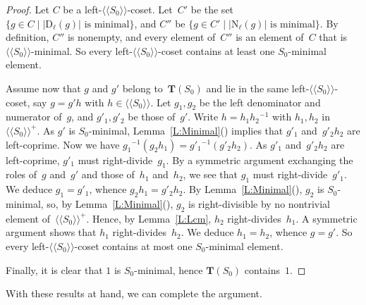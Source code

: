 \documentclass{amsart}
\numberwithin{equation}{section}
\theoremstyle{plain}
\theoremstyle{definition}
\newcounter{ITEM}
\begin{document}
\begin{proof}
Let ${C}$ be a left-${\langle\!\langle{{{S}_0}}\rangle\!\rangle}$-coset. Let~${C}'$ be the set
$\{{g} \in {C} \mid \mbox{${\vert{{{\scriptstyle\mathrm{D}}{_{\ell}}({g})}}\vert}$ is minimal}\}$, and ${C}''$ be $\{{g} \in {C}' \mid \mbox{${\vert{{{\scriptstyle\mathrm{N}}{_{\ell}}({g})}}\vert}$ is minimal}\}$. By definition, ${C}''$ is nonempty, and every element of~${C}''$ is an element of~${C}$ that is ${\langle\!\langle{{{S}_0}}\rangle\!\rangle}$-minimal. So every left-${\langle\!\langle{{{S}_0}}\rangle\!\rangle}$-coset contains at least one ${S}_0$-minimal element.

Assume now that ${g}$ and ${g}'$ belong to~${\boldsymbol{T}}({S}_0)$ and lie in the same left-${\langle\!\langle{{{S}_0}}\rangle\!\rangle}$-coset, say ${g} = {g}' {h}$ with ${h} \in {\langle\!\langle{{{S}_0}}\rangle\!\rangle}$. Let ${g}_1, {g}_2$ be the left denominator and numerator of~${g}$, and ${g}'_1, {g}'_2$ be those of~${g}'$. Write ${h} = {h}_1 {h}_2{^{-1}}$ with ${h}_1, {h}_2$ in~${\langle\!\langle{{{S}_0}}\rangle\!\rangle^{\!\scriptscriptstyle+}}$. As ${g}'$ is ${S}_0$-minimal, Lemma~\ref{L:Minimal}{\setcounter{ITEM}{2}\leavevmode\hbox{\rm()}} implies that ${g}'_1$ and~${g}'_2 {h}_2$ are left-coprime. Now we have ${g}_1{^{-1}} ({g}_2 {h}_1) = {g}'_1{}{^{-1}} ({g}'_2 {h}_2)$. As ${g}'_1$ and~${g}'_2 {h}_2$ are left-coprime, ${g}'_1$ must right-divide~${g}_1$. By a symmetric argument exchanging the roles of~${g}$ and~${g}'$ and those of~${h}_1$ and~${h}_2$, we see that ${g}_1$ must right-divide~${g}'_1$. We deduce ${g}_1 = {g}'_1$, whence ${g}_2 {h}_1 = {g}'_2 {h}_2$. By Lemma~\ref{L:Minimal}{\setcounter{ITEM}{4}\leavevmode\hbox{\rm()}}, ${g}_2$ is ${S}_0$-minimal, so, by Lemma~\ref{L:Minimal}{\setcounter{ITEM}{1}\leavevmode\hbox{\rm()}}, ${g}_2$ is right-divisible by no nontrivial element of~${\langle\!\langle{{{S}_0}}\rangle\!\rangle^{\!\scriptscriptstyle+}}$. Hence, by Lemma~\ref{L:Lcm}, ${h}_2$ right-divides~${h}_1$. A symmetric argument shows that ${h}_1$ right-divides~${h}_2$. We deduce ${h}_1 = {h}_2$, whence ${g} = {g}'$. So every left-${\langle\!\langle{{{S}_0}}\rangle\!\rangle}$-coset contains at most one ${S}_0$-minimal element.

Finally, it is clear that $1$ is ${S}_0$-minimal, hence ${\boldsymbol{T}}({S}_0)$ contains~$1$.
\end{proof}

With these results at hand, we can complete the argument.
\end{document}
